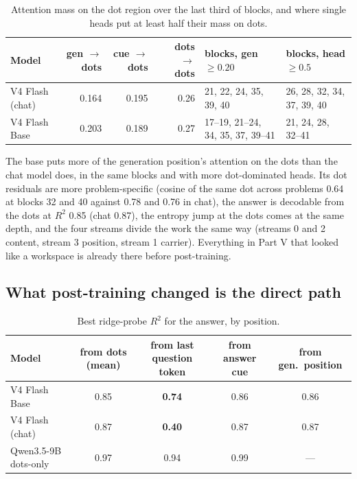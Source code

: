 \documentclass[11pt]{article}
\begin{document}
\begin{table}[h]\centering\footnotesize
\begin{tabular}{lrrrp{3.1cm}p{2.6cm}}\toprule
Model & gen $\to$ dots & cue $\to$ dots & dots $\to$ dots & blocks, gen $\geq 0.20$ & blocks, head $\geq 0.5$ \\ \midrule
V4 Flash (chat) & 0.164 & 0.195 & 0.26 & 21, 22, 24, 35, 39, 40 & 26, 28, 32, 34, 37, 39, 40 \\
V4 Flash Base & 0.203 & 0.189 & 0.27 & 17--19, 21--24, 34, 35, 37, 39--41 & 21, 24, 28, 32--41 \\ \bottomrule
\end{tabular}
\caption{Attention mass on the dot region over the last third of blocks, and where single heads put at least half their mass on dots.}\end{table}

The base puts more of the generation position's attention on the dots than the chat model does, in the same blocks and with more dot-dominated heads. Its dot residuals are more problem-specific (cosine of the same dot across problems 0.64 at blocks 32 and 40 against 0.78 and 0.76 in chat), the answer is decodable from the dots at $R^2$ 0.85 (chat 0.87), the entropy jump at the dots comes at the same depth, and the four streams divide the work the same way (streams 0 and 2 content, stream 3 position, stream 1 carrier). Everything in Part V that looked like a workspace is already there before post-training.

\subsection{What post-training changed is the direct path}

\begin{table}[h]\centering\footnotesize
\begin{tabular}{lcccc}\toprule
Model & from dots (mean) & from last question token & from answer cue & from gen.\ position \\ \midrule
V4 Flash Base & 0.85 & \textbf{0.74} & 0.86 & 0.86 \\
V4 Flash (chat) & 0.87 & \textbf{0.40} & 0.87 & 0.87 \\
Qwen3.5-9B dots-only & 0.97 & 0.94 & 0.99 & --- \\ \bottomrule
\end{tabular}
\caption{Best ridge-probe $R^2$ for the answer, by position.}\end{table}
\end{document}
